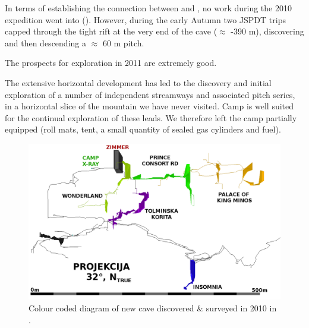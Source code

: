 In terms of establishing the connection between  and
, no work during the 2010 expedition went into 
(). However, during the early Autumn two JSPDT trips
capped through the tight rift at the very end of the cave
($\approx$ -390 m), discovering and then descending a
$\approx$ 60 m pitch.

The prospects for exploration in 2011 are extremely good.

The extensive horizontal development has led to the discovery and
initial exploration of a number of independent streamways and associated
pitch series, in a horizontal slice of the mountain we have never
visited. Camp  is well suited for the continual exploration
of these leads. We therefore left the camp partially equipped (roll
mats, tent, a small quantity of sealed gas cylinders and fuel).

\begin{figure}
\includegraphics[width=0.85\columnwidth]{2010/overview/2010_deep_vrtnarija_colour_coded_inverted_labelled.png}
\caption{Colour coded diagram of new cave discovered \& surveyed in 2010 in
.}
\end{figure}
